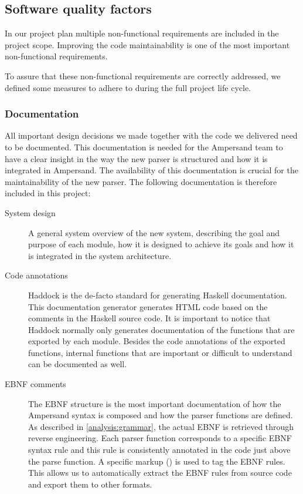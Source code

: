 
\subsection{Software quality factors}
\label{design:software-quality}
In our project plan  multiple non-functional requirements are included in the project scope.
Improving the code maintainability is one of the most important non-functional requirements.

To assure that these non-functional requirements are correctly addressed, we defined some measures to adhere to during the full project life cycle.

\subsubsection{Documentation}
All important design decisions we made together with the code we delivered need to be documented.
This documentation is needed for the Ampersand team to have a clear insight in the way the new parser is structured and how it is integrated in Ampersand.
The availability of this documentation is crucial for the maintainability of the new parser.
The following documentation is therefore included in this project:
%
\begin{description}
  \item[System design]
    A general system overview of the new system, describing the goal and purpose of each module, how it is designed to achieve its goals and how it is integrated in the system architecture.
  \item[Code annotations]
    Haddock is the de-facto standard for generating Haskell documentation. 
    This documentation generator generates HTML code based on the comments in the Haskell source code.
    It is important to notice that Haddock normally only generates documentation of the functions that are exported by each module.
    Besides the code annotations of the exported functions, internal functions that are important or difficult to understand can be documented as well.
  \item[EBNF comments]
    The EBNF structure is the most important documentation of how the Ampersand syntax is composed and how the parser functions are defined.
    As described in \autoref{analysis:grammar}, the actual EBNF is retrieved through reverse engineering.
    Each parser function corresponds to a specific EBNF syntax rule and this rule is consistently annotated in the code just above the parse function.
  A specific markup (\code{------}) is used to tag the EBNF rules.
  This allows us to automatically extract the EBNF rules from source code and export them to other formats.
\end{description}

